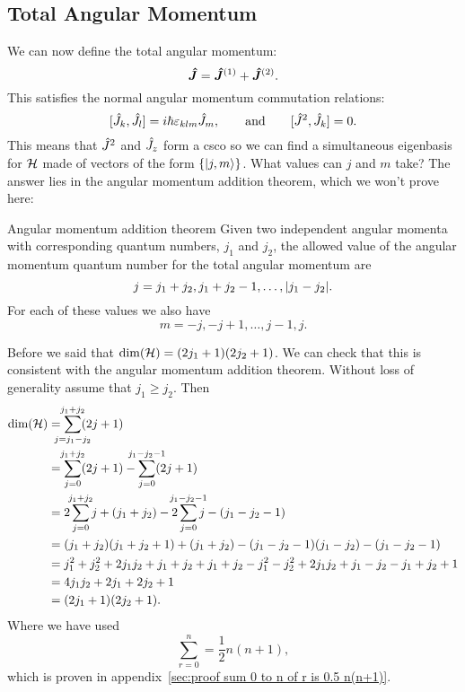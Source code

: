 \subsection{Total Angular Momentum}\label{sec:total angular momentum}
We can now define the total angular momentum:
\[\bm{\hat{J}} = \bm{\hat{J}}^{(1)} + \bm{\hat{J}}^{(2)}.\]
This satisfies the normal angular momentum commutation relations:
\[[\hat{J}_k, \hat{J}_l] = i\hbar\varepsilon_{klm}\hat{J}_m, \qquad\text{and}\qquad [\hat{J}^2, \hat{J}_k] = 0.\]
This means that \(\hat{J}^2\) and \(\hat{J}_z\) form a \gls{csco} so we can find a simultaneous eigenbasis for \(\mathcal{H}\) made of vectors of the form \(\{\vert {j, m} \rangle\}\).
What values can \(j\) and \(m\) take?
The answer lies in the angular momentum addition theorem, which we won't prove here:
\begin{theorem}{Angular momentum addition theorem}{}
    Given two independent angular momenta with corresponding quantum numbers, \(j_1\) and \(j_2\), the allowed value of the angular momentum quantum number for the total angular momentum are
    \[j = j_1 + j_2, j_1 + j_2 - 1, \dotsc, \abs{j_1 - j_2}.\]
    For each of these values we also have
    \[m = -j, -j + 1, \dotsc, j - 1, j.\]
\end{theorem}
Before we said that \(\dim(\mathcal{H}) = (2j_1 + 1)(2j_2 + 1)\).
We can check that this is consistent with the angular momentum addition theorem.
Without loss of generality assume that \(j_1 \ge j_2\).
Then
\begin{align*}
    \dim(\hilbert) &= \sum_{\mathclap{j=j_1 - j_2}}^{\mathclap{j_1 + j_2}} (2j + 1)\\
    &= \sum_{j=0}^{\mathclap{j_1 + j_2}} (2j + 1) - \sum_{j = 0}^{\mathclap{j_1 - j_2 - 1}} (2j + 1)\\
    &= 2\sum_{j=0}^{\mathclap{j_1 + j_2}} j + (j_1 + j_2) - 2\sum_{j = 0}^{\mathclap{j_1 - j_2 - 1}} j - (j_1 - j_2 - 1 )\\
    &= (j_1 + j_2)(j_1 + j_2 + 1) + (j_1 + j_2) - (j_1 - j_2 - 1)(j_1 - j_2) - (j_1 - j_2 - 1)\\
    &= j_1^2 + j_2^2 + 2j_1j_2 + j_1 + j_2 + j_1 + j_2 - j_1^2 - j_2^2 + 2j_1j_2 + j_1 - j_2 - j_1 + j_2 + 1\\
    &= 4j_1j_2 + 2j_1 + 2j_2 + 1\\
    &= (2j_1 + 1)(2j_2 + 1).\\
\end{align*}
Where we have used
\[\sum_{r = 0}^n = \frac{1}{2}n(n + 1),\]
which is proven in appendix~\ref{sec:proof sum 0 to n of r is 0.5 n(n+1)}.
